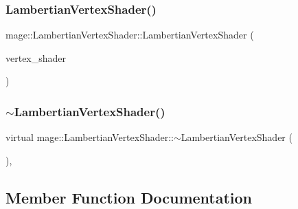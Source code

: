 \subsubsection{\texorpdfstring{Lambertian\+Vertex\+Shader()}{LambertianVertexShader()}\hspace{0.1cm}{\footnotesize\ttfamily [3/3]}}
{\footnotesize\ttfamily mage\+::\+Lambertian\+Vertex\+Shader\+::\+Lambertian\+Vertex\+Shader (\begin{DoxyParamCaption}\item[{\hyperlink{classmage_1_1_lambertian_vertex_shader}{Lambertian\+Vertex\+Shader} \&\&}]{vertex\+\_\+shader }\end{DoxyParamCaption})\hspace{0.3cm}{\ttfamily [default]}}

\hypertarget{classmage_1_1_lambertian_vertex_shader_a55636fd3817b97b6529690d6e3e5cd46}{}\label{classmage_1_1_lambertian_vertex_shader_a55636fd3817b97b6529690d6e3e5cd46} 
\subsubsection{\texorpdfstring{$\sim$\+Lambertian\+Vertex\+Shader()}{~LambertianVertexShader()}}
{\footnotesize\ttfamily virtual mage\+::\+Lambertian\+Vertex\+Shader\+::$\sim$\+Lambertian\+Vertex\+Shader (\begin{DoxyParamCaption}{ }\end{DoxyParamCaption})\hspace{0.3cm}{\ttfamily [virtual]}, {\ttfamily [default]}}



\subsection{Member Function Documentation}
\hypertarget{classmage_1_1_lambertian_vertex_shader_a974b43346ab5d8081d9101f715e7670d}{}\label{classmage_1_1_lambertian_vertex_shader_a974b43346ab5d8081d9101f715e7670d} 
